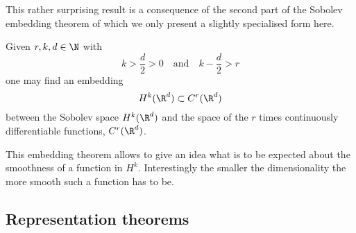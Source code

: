 This rather surprising result is a consequence of the second part of
the Sobolev embedding theorem
of which we only present a slightly specialised form  here.
\begin{thm}
	Given $r, k, d \in \N$ with
	\[ k > \frac{d}{2} > 0 \quad \text{and} \quad k -\frac{d}{2} > r \]
	one may find an embedding
	\[ H^k(\R^d) \subset C^r(\R^d) \]
	between the Sobolev space $H^k(\R^d)$ and the space of the $r$ times
	continuously differentiable functions, $C^r(\R^d)$.
\end{thm}
This embedding theorem allows to give an idea what is to be expected about
the smoothness of a function in $H^k$.
Interestingly the smaller the dimensionality the more smooth such a function
has to be.

\subsection{Representation theorems}
